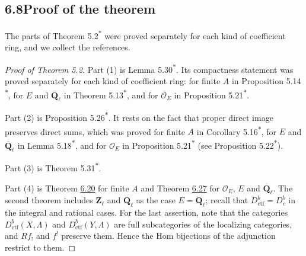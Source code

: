 \documentclass[11pt]{article}
\newcommand{\bpout}[1]{#1\textsuperscript{\hyperlink{bp-outside}{\ensuremath{\ast}}}}
\providecommand{\Dbc}{}\renewcommand{\Dbc}{D^b_c}
\begin{document}
\subsection*{\texorpdfstring{6.8\quad Proof of the theorem}{6.8 Proof of the theorem}}
\label{bp86}%
\label{bp87}%
The parts of Theorem \bpout{5.2} were proved separately for each kind of coefficient ring, and we collect the references.

\begin{proof}[{Proof of Theorem 5.2}]\label{bp88}%
Part (1) is Lemma \bpout{5.30}. Its compactness statement was proved separately for each kind of coefficient ring: for finite \(A\) in Proposition \bpout{5.14}, for \(E\) and \(\overline{\mathbf Q}_\ell\) in Theorem \bpout{5.13}, and for \(\mathcal O_E\) in Proposition \bpout{5.21}.

Part (2) is Proposition \bpout{5.26}. It rests on the fact that proper direct image preserves direct sums, which was proved for finite \(A\) in Corollary \bpout{5.16}, for \(E\) and \(\overline{\mathbf Q}_\ell\) in Lemma \bpout{5.18}, and for \(\mathcal O_E\) in Proposition \bpout{5.21} (see Proposition \bpout{5.22}).

Part (3) is Theorem \bpout{5.31}.

Part (4) is Theorem \hyperref[bp61]{6.20} for finite \(A\) and Theorem \hyperref[bp84]{6.27} for \(\mathcal O_E\), \(E\) and \(\overline{\mathbf Q}_\ell\). The second theorem includes \(\mathbf Z_\ell\) and \(\mathbf Q_\ell\) as the case \(E=\mathbf Q_\ell\); recall that \(D^b_{\mathrm{ctf}}=\Dbc\) in the integral and rational cases. For the last assertion, note that the categories \(D^b_{\mathrm{ctf}}(X,\Lambda)\) and \(D^b_{\mathrm{ctf}}(Y,\Lambda)\) are full subcategories of the localizing categories, and \(Rf_!\) and \(f^!\) preserve them. Hence the Hom bijections of the adjunction restrict to them.
\end{proof}



\clearpage{}\hypertarget{bp-outside}{}%
\end{document}
